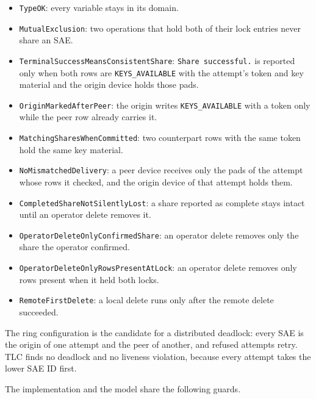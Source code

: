 \documentclass[11pt,a4paper]{article}
\begin{document}
\begin{itemize}
  \setlength{\itemsep}{0.15em}
  \item \texttt{TypeOK}: every variable stays in its domain.
  \item \texttt{MutualExclusion}: two operations that hold both of their lock
        entries never share an SAE.
  \item \texttt{TerminalSuccessMeansConsistentShare}: \texttt{Share
        successful.} is reported only when both rows are
        \texttt{KEYS\_AVAILABLE} with the attempt's token and key material and
        the origin device holds those pads.
  \item \texttt{OriginMarkedAfterPeer}: the origin writes
        \texttt{KEYS\_AVAILABLE} with a token only while the peer row already
        carries it.
  \item \texttt{MatchingSharesWhenCommitted}: two counterpart rows with the
        same token hold the same key material.
  \item \texttt{NoMismatchedDelivery}: a peer device receives only the pads of
        the attempt whose rows it checked, and the origin device of that
        attempt holds them.
  \item \texttt{CompletedShareNotSilentlyLost}: a share reported as complete
        stays intact until an operator delete removes it.
  \item \texttt{OperatorDeleteOnlyConfirmedShare}: an operator delete removes
        only the share the operator confirmed.
  \item \texttt{OperatorDeleteOnlyRowsPresentAtLock}: an operator delete
        removes only rows present when it held both locks.
  \item \texttt{RemoteFirstDelete}: a local delete runs only after the remote
        delete succeeded.
\end{itemize}

\noindent
The ring configuration is the candidate for a distributed deadlock: every SAE
is the origin of one attempt and the peer of another, and refused attempts
retry. TLC finds no deadlock and no liveness violation, because every
attempt takes the lower SAE ID first.

\noindent
The implementation and the model share the following guards.
\end{document}
